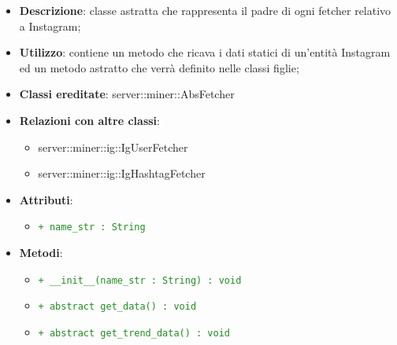 			\begin{itemize}
				\item \textbf{Descrizione}: classe astratta che rappresenta il padre di ogni fetcher relativo a Instagram;
				\item \textbf{Utilizzo}: contiene un metodo che ricava i dati statici di un'entità Instagram ed un metodo astratto che verrà definito nelle classi figlie;
				\item \textbf{Classi ereditate}: server::miner::AbsFetcher
				\item \textbf{Relazioni con altre classi}:
					\begin{itemize}
						\item server::miner::ig::IgUserFetcher
						\item server::miner::ig::IgHashtagFetcher
					\end{itemize}
				\item \textbf{Attributi}:    
					\begin{itemize}
						\item \textcolor{forestgreen}{\texttt{+ name\_str : String}}
					\end{itemize}
				\item \textbf{Metodi}:  
					\begin{itemize}
						\item \textcolor{forestgreen}{\texttt{+ \_\_init\_\_(name\_str : String) : void}}
						\item \textcolor{forestgreen}{\texttt{+ abstract get\_data() : void}}
						\item \textcolor{forestgreen}{\texttt{+ abstract get\_trend\_data() : void}}
					\end{itemize}
			\end{itemize}

